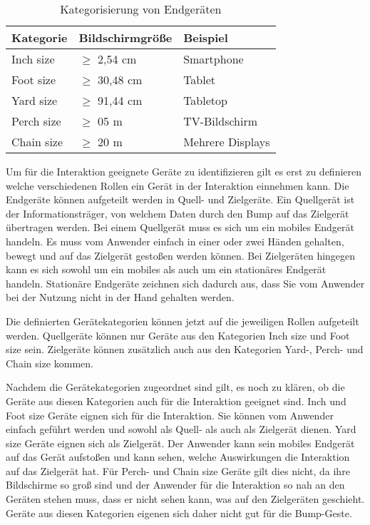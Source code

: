 \begin{table}[H]
\begin{tabular}{| >{\arraybackslash}m{4.2cm} | >{\centering\arraybackslash}m{4.2cm} | >{\centering\arraybackslash}m{4.2cm} |}
\hline
\cellcolor[HTML]{C0C0C0}Kategorie   & \cellcolor[HTML]{C0C0C0} Bildschirmgröße &  \cellcolor[HTML]{C0C0C0} Beispiel       \\ \hline
Inch size                           &  $\ge$  2,54 cm                            &  Smartphone                             \\ \hline
\cellcolor[HTML]{EFEFEF}Foot size   &  \cellcolor[HTML]{EFEFEF}  $\ge$ 30,48 cm    &  \cellcolor[HTML]{EFEFEF}Tablet         \\ \hline
Yard size                           &  $\ge$ 91,44 cm                          &  Tabletop                               \\ \hline
\cellcolor[HTML]{EFEFEF}Perch size  &  \cellcolor[HTML]{EFEFEF}  $\ge$   05 m     & \cellcolor[HTML]{EFEFEF} TV-Bildschirm  \\ \hline
Chain size                          &  $\ge$   20 m                              &  Mehrere Displays                       \\ \hline
\end{tabular}
\caption{Kategorisierung von Endgeräten}
\label{kategory}
\end{table}


Um für die Interaktion geeignete Geräte zu identifizieren gilt es erst zu definieren welche verschiedenen Rollen ein Gerät in der Interaktion einnehmen kann. Die Endgeräte können aufgeteilt werden in Quell- und Zielgeräte. Ein Quellgerät ist der Informationsträger, von welchem Daten durch den Bump auf das Zielgerät übertragen werden. Bei einem Quellgerät muss es sich um ein mobiles Endgerät handeln. Es muss vom Anwender einfach in einer oder zwei Händen gehalten, bewegt und auf das Zielgerät gestoßen werden können. Bei Zielgeräten hingegen kann es sich sowohl um ein mobiles als auch um ein stationäres Endgerät handeln. Stationäre Endgeräte zeichnen sich dadurch aus, dass Sie vom Anwender bei der Nutzung nicht in der Hand gehalten werden.

Die definierten Gerätekategorien können jetzt auf die jeweiligen Rollen aufgeteilt werden. Quellgeräte können nur Geräte aus den Kategorien Inch size und Foot size sein. Zielgeräte können zusätzlich auch aus den Kategorien Yard-, Perch- und Chain size kommen.

Nachdem die Gerätekategorien zugeordnet sind gilt, es noch zu klären, ob die Geräte aus diesen Kategorien auch für die Interaktion geeignet sind. Inch und Foot size Geräte eignen sich für die Interaktion. Sie können vom Anwender einfach geführt werden und sowohl als Quell- als auch als Zielgerät dienen. Yard size Geräte eignen sich als Zielgerät. Der Anwender kann sein mobiles Endgerät auf das Gerät aufstoßen und kann sehen, welche Auswirkungen die Interaktion auf das Zielgerät hat. Für Perch- und Chain size Geräte gilt dies nicht, da ihre Bildschirme so groß sind und der Anwender für die Interaktion so nah an den Geräten stehen muss, dass er nicht sehen kann, was auf den Zielgeräten geschieht. Geräte aus diesen Kategorien eigenen sich daher nicht gut für die Bump-Geste. 

